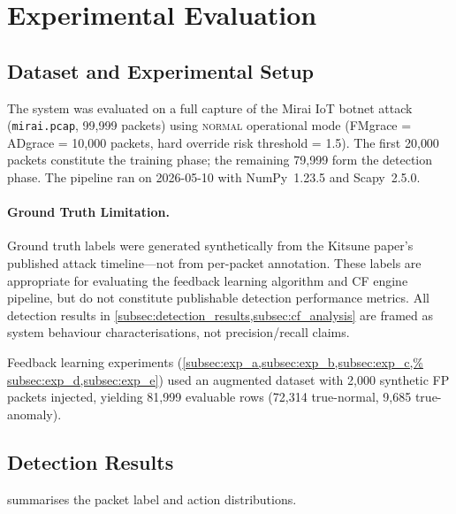 \documentclass[preprint,12pt,authoryear]{elsarticle}
\begin{document}
\section{Experimental Evaluation}
\label{sec:evaluation}

\subsection{Dataset and Experimental Setup}
\label{subsec:setup}

The system was evaluated on a full capture of the Mirai IoT botnet attack
(\texttt{mirai.pcap}, 99{,}999 packets) using \textsc{normal} operational mode
(FMgrace = ADgrace = 10{,}000 packets, hard override risk threshold = 1.5). The
first 20{,}000 packets constitute the training phase; the remaining 79{,}999 form
the detection phase. The pipeline ran on 2026-05-10 with NumPy~1.23.5 and
Scapy~2.5.0.

\paragraph{Ground Truth Limitation.}
Ground truth labels were generated synthetically from the Kitsune paper's
published attack timeline---not from per-packet annotation. These labels are
appropriate for evaluating the feedback learning algorithm and CF engine pipeline,
but do not constitute publishable detection performance metrics. All detection
results in \cref{subsec:detection_results,subsec:cf_analysis} are framed as
system behaviour characterisations, not precision/recall claims.

Feedback learning experiments (\cref{subsec:exp_a,subsec:exp_b,subsec:exp_c,%
subsec:exp_d,subsec:exp_e}) used an augmented dataset with 2{,}000 synthetic FP
packets injected, yielding 81{,}999 evaluable rows (72{,}314 true-normal,
9{,}685 true-anomaly).

\subsection{Detection Results}
\label{subsec:detection_results}

 summarises the packet label and action distributions.
\end{document}
